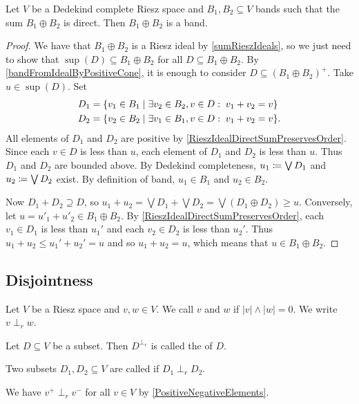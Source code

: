 \begin{proposition} \label{DedekindCompleteDirectSumBands}
Let $V$ be a Dedekind complete Riesz space and $B_1, B_2\subseteq V$ bands such that the sum $B_1\oplus B_2$ is direct. Then $B_1 \oplus B_2$ is a band.
\end{proposition}
\begin{proof}
We have that $B_1\oplus B_2$ is a Riesz ideal by \ref{sumRieszIdeals}, so we just need to show that $\sup(D)\subseteq B_1\oplus B_2$ for all $D\subseteq B_1\oplus B_2$. By \ref{bandFromIdealByPositiveCone}, it is enough to consider $D\subseteq (B_1\oplus B_2)^+$. Take $u\in \sup(D)$. Set
\begin{align*}
D_1 &= \setbuilder{v_1\in B_1}{\exists v_2\in B_2, v\in D: \; v_1 + v_2 = v} \\
D_2 &= \setbuilder{v_2\in B_2}{\exists v_1\in B_1, v\in D: \; v_1 + v_2 = v}.
\end{align*}
All elements of $D_1$ and $D_2$ are positive by \ref{RieszIdealDirectSumPreservesOrder}. Since each $v\in D$ is less than $u$, each element of $D_1$ and $D_2$ is less than $u$. Thus $D_1$ and $D_2$ are bounded above. By Dedekind completeness, $u_1\coloneqq \bigvee D_1$ and $u_2\coloneqq \bigvee D_2$ exist. By definition of band, $u_1\in B_1$ and $u_2\in B_2$.

Now $D_1 + D_2 \supseteq D$, so $u_1 + u_2 = \bigvee D_1 + \bigvee D_2 = \bigvee(D_1\oplus D_2) \geq u$. Conversely, let $u = u'_1 + u'_2\in B_1\oplus B_2$. By \ref{RieszIdealDirectSumPreservesOrder}, each $v_1\in D_1$ is less than $u_1'$ and each $v_2\in D_2$ is less than $u_2'$. Thus $u_1 +u_2 \leq u_1'+u_2' = u$ and so $u_1 + u_2 = u$, which means that $u\in B_1\oplus B_2$.
\end{proof}

\subsection{Disjointness}
\begin{definition}
Let $V$ be a Riesz space and $v,w\in V$. We call $v$ and $w$  if $|v|\wedge |w| = 0$. We write $v\perp_r w$.

Let $D\subseteq V$ be a subset. Then $D^{\perp_r}$ is called the  of $D$.

Two subsets $D_1,D_2\subseteq V$ are called  if $D_1 \perp_r D_2$.
\end{definition}
We have $v^+\perp_r v^-$ for all $v\in V$ by \ref{PositiveNegativeElements}.


